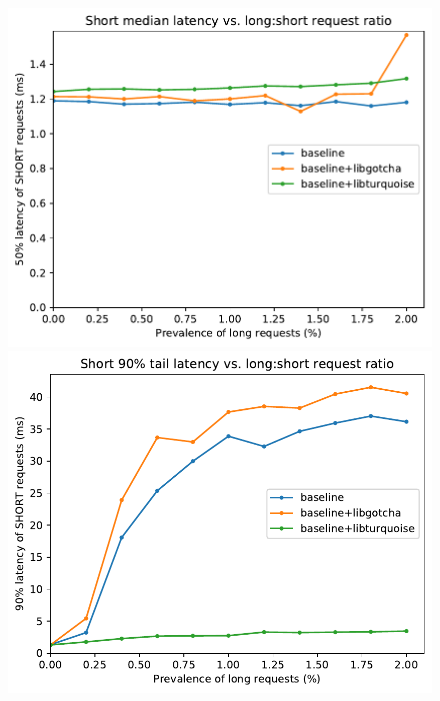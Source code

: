 \begin{figure}
	\begin{minipage}{0.5\textwidth}
	\includegraphics[width=\textwidth]{figs/twooom_50-short}
	\end{minipage}
%
	\begin{minipage}{0.5\textwidth}
	\includegraphics[width=\textwidth]{figs/twooom_90-short}
	\end{minipage}


\end{figure}
